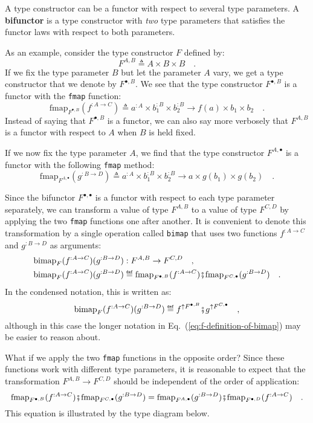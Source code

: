 A type constructor can be a functor with respect to several type parameters.
A \textbf{bifunctor} is a type constructor with
\emph{two} type parameters that satisfies the functor laws with respect
to both parameters.

As an example, consider the type constructor $F$ defined by:
\[
F^{A,B}\triangleq A\times B\times B\quad.
\]
If we fix the type parameter $B$ but let the parameter $A$ vary,
we get a type constructor that we denote by $F^{\bullet,B}$. We see
that the type constructor $F^{\bullet,B}$ is a functor with the \lstinline!fmap!
function:
\[
\text{fmap}_{F^{\bullet,B}}(f^{:A\rightarrow C})\triangleq a^{:A}\times b_{1}^{:B}\times b_{2}^{:B}\rightarrow f(a)\times b_{1}\times b_{2}\quad.
\]
Instead of saying that $F^{\bullet,B}$ is a functor, we can also
say more verbosely that $F^{A,B}$ is a functor with respect to $A$
when $B$ is held fixed. 

If we now fix the type parameter $A$, we find that the type constructor
$F^{A,\bullet}$ is a functor with the following \lstinline!fmap!
method:
\[
\text{fmap}_{F^{A,\bullet}}(g^{:B\rightarrow D})\triangleq a^{:A}\times b_{1}^{:B}\times b_{2}^{:B}\rightarrow a\times g(b_{1})\times g(b_{2})\quad.
\]

Since the bifunctor $F^{\bullet,\bullet}$ is a functor with respect
to each type parameter separately, we can transform a value of type
$F^{A,B}$ to a value of type $F^{C,D}$ by applying the two \lstinline!fmap!
functions one after another. It is convenient to denote this transformation
by a single operation called \lstinline!bimap! that uses two functions
$f^{:A\rightarrow C}$ and $g^{:B\rightarrow D}$ as arguments:
\begin{align}
\text{bimap}_{F}(f^{:A\rightarrow C})(g^{:B\rightarrow D}) & :F^{A,B}\rightarrow F^{C,D}\quad,\nonumber \\
\text{bimap}_{F}(f^{:A\rightarrow C})(g^{:B\rightarrow D}) & \triangleq\text{fmap}_{F^{\bullet,B}}(f^{:A\rightarrow C})\bef\text{fmap}_{F^{C,\bullet}}(g^{:B\rightarrow D})\quad.\label{eq:f-definition-of-bimap}
\end{align}
In the condensed notation, this is written as:
\[
\text{bimap}_{F}(f^{:A\rightarrow C})(g^{:B\rightarrow D})\triangleq f^{\uparrow F^{\bullet,B}}\bef g^{\uparrow F^{C,\bullet}}\quad,
\]
although in this case the longer notation in Eq.~(\ref{eq:f-definition-of-bimap})
may be easier to reason about. 

What if we apply the two \lstinline!fmap! functions in the opposite
order? Since these functions work with different type parameters,
it is reasonable to expect that the transformation $F^{A,B}\rightarrow F^{C,D}$
should be independent of the order of application:
\begin{equation}
\text{fmap}_{F^{\bullet,B}}(f^{:A\rightarrow C})\bef\text{fmap}_{F^{C,\bullet}}(g^{:B\rightarrow D})=\text{fmap}_{F^{A,\bullet}}(g^{:B\rightarrow D})\bef\text{fmap}_{F^{\bullet,D}}(f^{:A\rightarrow C})\quad.\label{eq:f-fmap-fmap-bifunctor-commutativity}
\end{equation}
This equation is illustrated by the type diagram below.

